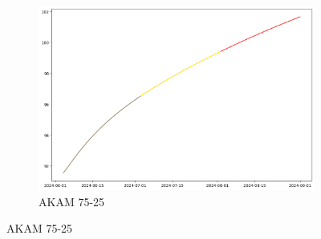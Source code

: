 \documentclass{ieeeojies}
\begin{document}
\begin{figure}[H]
\begin{subfigure}[b]{0.33\linewidth}
        \includegraphics[width=\linewidth]{GRU Plot/GRU_AKAM_75_25_90days.png}
        \caption{AKAM 75-25}
        \label{fig:akam-75-25}
    \end{subfigure}
\end{figure}
\vspace{-20pt}
\end{document}
